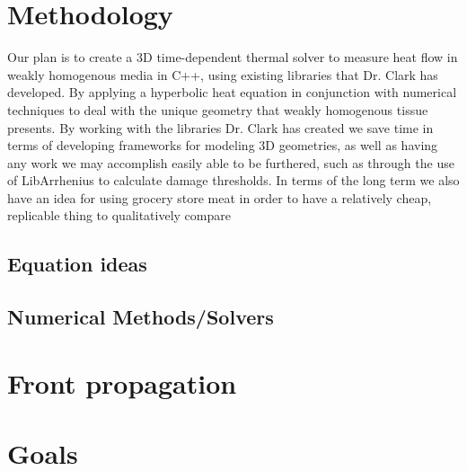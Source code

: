 \documentclass[12pt]{article}
\begin{document}
\section{Methodology}
Our plan is to create a 3D time-dependent thermal solver to measure heat flow in weakly homogenous media in C++, using existing libraries that Dr. Clark has developed. By applying a hyperbolic heat equation in conjunction with numerical techniques to deal with the unique geometry that weakly homogenous tissue presents. By working with the libraries Dr. Clark has created we save time in terms of developing frameworks for modeling 3D geometries, as well as having any work we may accomplish easily able to be furthered, such as through the use of LibArrhenius to calculate damage thresholds. In terms of the long term we also have an idea for using grocery store meat in order to have a relatively cheap, replicable thing to qualitatively compare

\subsection{Equation ideas}
\subsection{Numerical Methods/Solvers}
\section{Front propagation}
\section{Goals}
\end{document}
